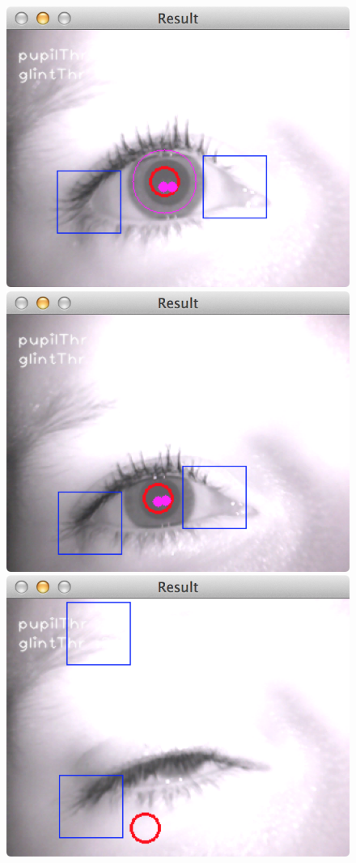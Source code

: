 \documentclass[a4paper,11pt]{article}
\begin{document}
\begin{figure}[ht]
  \centering
  \includegraphics[scale=0.3]{resgood}
  \includegraphics[scale=0.3]{resnoiris}
  \includegraphics[scale=0.3]{resnotworking}

\end{figure}
\end{document}
